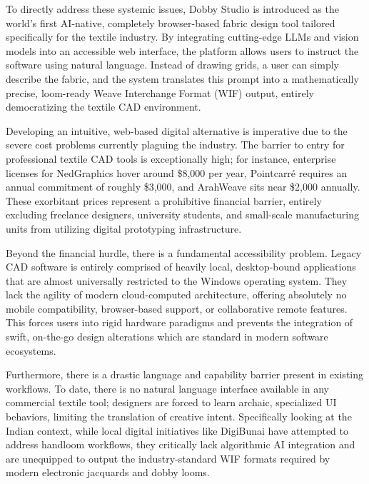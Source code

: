 To directly address these systemic issues, Dobby Studio is introduced as the world's first AI-native, completely browser-based fabric design tool tailored specifically for the textile industry. By integrating cutting-edge LLMs and vision models into an accessible web interface, the platform allows users to instruct the software using natural language. Instead of drawing grids, a user can simply describe the fabric, and the system translates this prompt into a mathematically precise, loom-ready Weave Interchange Format (WIF) output, entirely democratizing the textile CAD environment.

Developing an intuitive, web-based digital alternative is imperative due to the severe cost problems currently plaguing the industry. The barrier to entry for professional textile CAD tools is exceptionally high; for instance, enterprise licenses for NedGraphics hover around \$8,000 per year, Pointcarré requires an annual commitment of roughly \$3,000, and ArahWeave sits near \$2,000 annually. These exorbitant prices represent a prohibitive financial barrier, entirely excluding freelance designers, university students, and small-scale manufacturing units from utilizing digital prototyping infrastructure.

Beyond the financial hurdle, there is a fundamental accessibility problem. Legacy CAD software is entirely comprised of heavily local, desktop-bound applications that are almost universally restricted to the Windows operating system. They lack the agility of modern cloud-computed architecture, offering absolutely no mobile compatibility, browser-based support, or collaborative remote features. This forces users into rigid hardware paradigms and prevents the integration of swift, on-the-go design alterations which are standard in modern software ecosystems.

Furthermore, there is a drastic language and capability barrier present in existing workflows. To date, there is no natural language interface available in any commercial textile tool; designers are forced to learn archaic, specialized UI behaviors, limiting the translation of creative intent. Specifically looking at the Indian context, while local digital initiatives like DigiBunai have attempted to address handloom workflows, they critically lack algorithmic AI integration and are unequipped to output the industry-standard WIF formats required by modern electronic jacquards and dobby looms.

